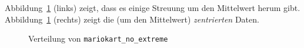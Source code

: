 \documentclass[
  a4paper,
]{scrbook}
\theoremstyle{definition}
\theoremstyle{definition}
\theoremstyle{definition}
\theoremstyle{remark}
\begin{document}
Abbildung~\ref{fig-mariokart_no_extreme} (links) zeigt, dass es einige
Streuung um den Mittelwert herum gibt.
Abbildung~\ref{fig-mariokart_no_extreme} (rechts) zeigt die (um den
Mittelwert) \emph{zentrierten} Daten.

\begin{figure}

\begin{minipage}{0.50\linewidth}



\end{minipage}%
%
\begin{minipage}{0.50\linewidth}



\end{minipage}%

\caption{\label{fig-mariokart_no_extreme}Verteilung von
\texttt{mariokart\_no\_extreme}}

\end{figure}%
\end{document}
